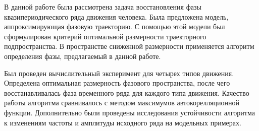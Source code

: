 \documentclass[12pt, twoside]{article}
\theoremstyle{definition}
\begin{document}
В данной работе была рассмотрена задача восстановления фазы квазипериодического ряда движения человека. Была предложена модель, аппроксимирующая фазовую траекторию. С помощью этой модели был сформулирован критерий оптимальной размерности траекторного подпространства. В пространстве сниженной размерности применяется алгоритм определения фазы, предлагаемый в данной работе.

Был проведен вычислительный эксперимент для четырех типов движения. Определена оптимальная размерность фазового пространства, после чего восстанавливалась фаза временного ряда для каждого типа движения. Качество работы алгоритма сравнивалось с методом максимумов автокорелляционной функции. Дополнительно были проведены исследования устойчивости алгоритма к изменениям частоты и амплитуды исходного ряда на модельных примерах. 


\end{document}
